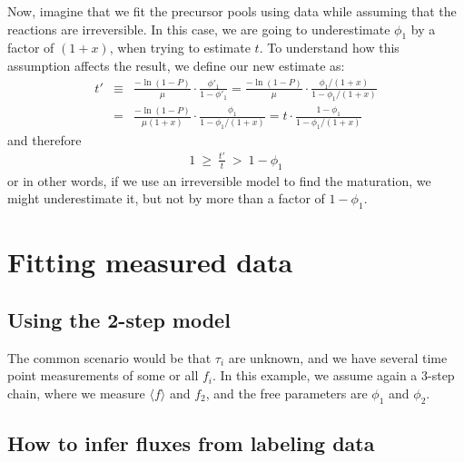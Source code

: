 \documentclass{article}
\newcommand{\fin}{\ensuremath{\langle f \rangle}}
\begin{document}
Now, imagine that we fit the precursor pools using data while assuming that the reactions are irreversible. In this case, we are going to underestimate $\phi_1$ by a factor of $(1+x)$, when trying to estimate $t$. To understand how this assumption affects the result, we define our new estimate as:
\begin{eqnarray}
    t' &\equiv& \frac{-\ln(1-P)}{\mu} \cdot \frac{\phi'_1}{1 - \phi'_1} 
    = \frac{-\ln(1-P)}{\mu} \cdot \frac{\phi_1/(1+x)}{1 - \phi_1/(1+x)} \nonumber\\
    &=& \frac{-\ln(1-P)}{\mu (1+x)} \cdot \frac{\phi_1}{1 - \phi_1/(1+x)} 
    = t \cdot \frac{1 - \phi_1}{1 - \phi_1/(1+x)}
\end{eqnarray}
and therefore
\begin{eqnarray}
    1 ~\geq~ \frac{t'}{t} ~>~ 1-\phi_1
\end{eqnarray}
or in other words, if we use an irreversible model to find the maturation, we might underestimate it, but not by more than a factor of $1-\phi_1$.

\clearpage
\section{Fitting measured data}

\subsection{Using the 2-step model}
The common scenario would be that $\tau_i$ are unknown, and we have several time point measurements of some or all $f_i$. In this example, we assume again a 3-step chain, where we measure $\fin$ and $f_2$, and the free parameters are $\phi_1$ and $\phi_2$. 

\subsection{How to infer fluxes from labeling data}
\end{document}
